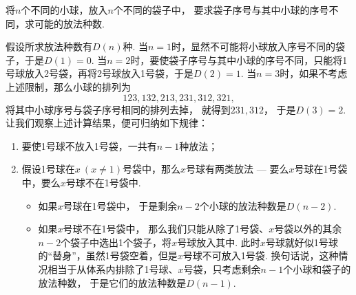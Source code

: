 \begin{example}[错排问题]
将\(n\)个不同的小球，放入\(n\)个不同的袋子中，
要求袋子序号与其中小球的序号不同，求可能的放法种数.
\begin{solution}
假设所求放法种数有\(D(n)\)种.
当\(n=1\)时，显然不可能将小球放入序号不同的袋子，于是\(D(1) = 0\).
当\(n=2\)时，要使袋子序号与其中小球的序号不同，只能将1号球放入2号袋，再将2号球放入1号袋，于是\(D(2) = 1\).
当\(n=3\)时，如果不考虑上述限制，那么小球的排列为\begin{equation*}
	123,
	132,
	213,
	231,
	312,
	321,
\end{equation*}
将其中小球序号与袋子序号相同的排列去掉，
就得到\(231,312\)，
于是\(D(3) = 2\).
让我们观察上述计算结果，便可归纳如下规律：
\begin{enumerate}
	\item 要使1号球不放入1号袋，一共有\(n-1\)种放法；
	\item 假设1号球在\(x\ (x\neq1)\)号袋中，那么\(x\)号球有两类放法
		--- 要么\(x\)号球在1号袋中，要么\(x\)号球不在1号袋中.

		\begin{itemize}
			\item 如果\(x\)号球在1号袋中，
			于是剩余\(n-2\)个小球的放法种数是\(D(n-2)\).

			\item 如果\(x\)号球不在1号袋中，
			那么我们只能从除了1号袋、\(x\)号袋以外的其余\(n-2\)个袋子中选出1个袋子，将\(x\)号球放入其中.
			此时\(x\)号球就好似1号球的“替身”，虽然1号袋空着，但是\(x\)号球不可放入1号袋.
			换句话说，这种情况相当于从体系内排除了1号球、\(x\)号袋，只考虑剩余\(n-1\)个小球和袋子的放法种数，
			于是它们的放法种数是\(D(n-1)\).
		\end{itemize}


\end{enumerate}
\end{solution}
\end{example}

